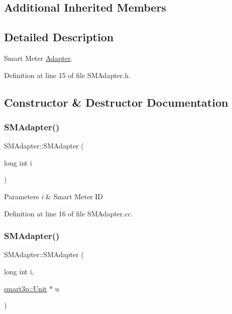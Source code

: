 \subsection*{Additional Inherited Members}


\subsection{Detailed Description}
Smart Meter \hyperlink{classAdapter}{Adapter}. 

Definition at line 15 of file S\+M\+Adapter.\+h.



\subsection{Constructor \& Destructor Documentation}
\mbox{\label{classSMAdapter_a5bf9ca331e0f7aac7c182ef080ef74eb}} 
\subsubsection{\texorpdfstring{S\+M\+Adapter()}{SMAdapter()}\hspace{0.1cm}{\footnotesize\ttfamily [1/2]}}
{\footnotesize\ttfamily S\+M\+Adapter\+::\+S\+M\+Adapter (\begin{DoxyParamCaption}\item[{long int}]{i }\end{DoxyParamCaption})}


\begin{DoxyParams}{Parameters}
{\em i} & Smart Meter ID \\
\hline
\end{DoxyParams}


Definition at line 16 of file S\+M\+Adapter.\+cc.

\mbox{\label{classSMAdapter_a4f8ec3739e23b40a4b4c3c26490d1c27}} 
\subsubsection{\texorpdfstring{S\+M\+Adapter()}{SMAdapter()}\hspace{0.1cm}{\footnotesize\ttfamily [2/2]}}
{\footnotesize\ttfamily S\+M\+Adapter\+::\+S\+M\+Adapter (\begin{DoxyParamCaption}\item[{long int}]{i,  }\item[{\hyperlink{classsmart3p_1_1Unit}{smart3p\+::\+Unit} $\ast$}]{u }\end{DoxyParamCaption})}


